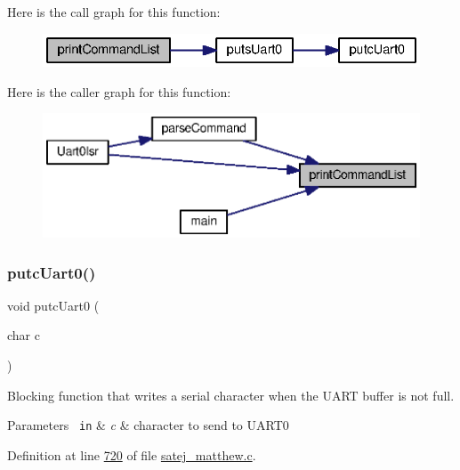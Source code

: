 Here is the call graph for this function\+:
\nopagebreak
\begin{figure}[H]
\begin{center}
\leavevmode
\includegraphics[width=329pt]{satej__matthew_8c_a9657c6b2d1c183503ca49b71da13e9e4_cgraph}
\end{center}
\end{figure}
Here is the caller graph for this function\+:
\nopagebreak
\begin{figure}[H]
\begin{center}
\leavevmode
\includegraphics[width=346pt]{satej__matthew_8c_a9657c6b2d1c183503ca49b71da13e9e4_icgraph}
\end{center}
\end{figure}
\mbox{\label{satej__matthew_8c_a27ebab6950bfb65d641dd04feb03906f}} 
\subsubsection{\texorpdfstring{putcUart0()}{putcUart0()}}
{\footnotesize\ttfamily void putc\+Uart0 (\begin{DoxyParamCaption}\item[{char}]{c }\end{DoxyParamCaption})}



Blocking function that writes a serial character when the U\+A\+RT buffer is not full. 


\begin{DoxyParams}[1]{Parameters}
\mbox{\texttt{ in}}  & {\em c} & character to send to U\+A\+R\+T0 \\
\hline
\end{DoxyParams}


Definition at line \mbox{\hyperlink{satej__matthew_8c_source_l00720}{720}} of file \mbox{\hyperlink{satej__matthew_8c_source}{satej\+\_\+matthew.\+c}}.

